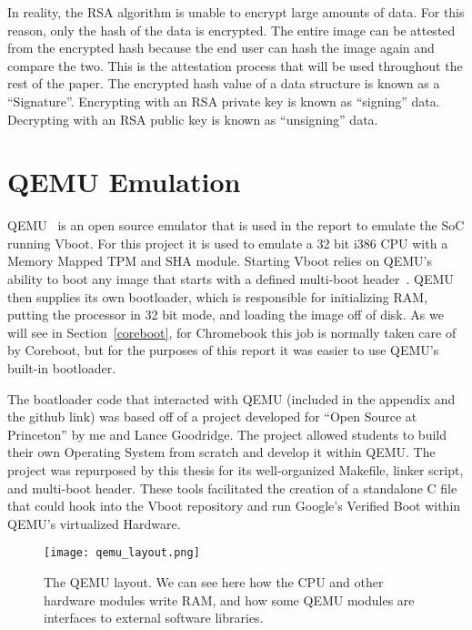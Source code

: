 In reality, the RSA algorithm is unable to encrypt large amounts of data.
For this reason, only the hash of the data is encrypted. 
The entire image can be attested from the encrypted hash because the end user
can hash the image again and compare the two.
This is the attestation process that will be used throughout the rest of the
paper.
The encrypted hash value of a data structure is known as a ``Signature''. 
Encrypting with an RSA private key is known as ``signing'' data.
Decrypting with an RSA public key is known as ``unsigning'' data.

\section{QEMU Emulation}\label{qemu_em}


QEMU~\cite{qemu-site} is an open source emulator that is used in the report to
emulate the SoC running Vboot.
For this project it is used to emulate a 32 bit i386 CPU with a Memory Mapped TPM and SHA module.
Starting Vboot relies on QEMU's ability to boot any image that starts with a defined multi-boot header~\cite{multiboot}.
QEMU then supplies its own bootloader, which is responsible for initializing RAM, putting the processor in 32 bit mode, and loading the image off of disk.
As we will see in Section~\ref{coreboot}, for Chromebook this job is normally taken care of by Coreboot, but for the purposes of this report it was easier to use QEMU's built-in bootloader.

The boatloader code that interacted with QEMU (included in the appendix and the
github link) was based off of a project developed for ``Open Source at
Princeton'' by me and Lance Goodridge.
The project allowed students to build their own Operating System from scratch and develop it within QEMU\@.
The project was repurposed by this thesis for its well-organized Makefile, linker script, and multi-boot header.
These tools facilitated the creation of a standalone C file that could hook into the Vboot repository and run Google's Verified Boot within QEMU's virtualized Hardware.

\begin{figure}
  \centering
  \texttt{[image: qemu\_layout.png]}
  \caption[QEMU Software Library Layout]{The QEMU layout. We can see here how the CPU and other hardware modules write RAM, and how some QEMU modules are interfaces to external software libraries.}
  \label{fig:qemu_layout}
\end{figure}

